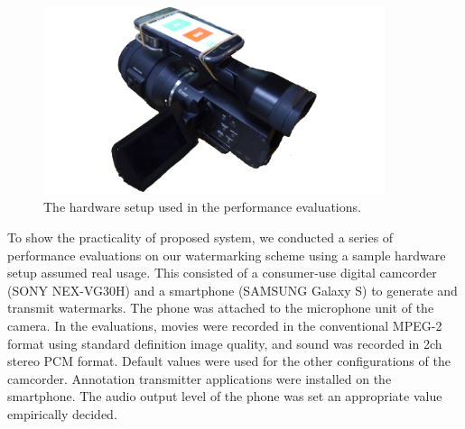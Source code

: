 \begin{figure}[htbp]
 \begin{center}
  \includegraphics[width=100mm]{evaluation_environment.pdf}
 \end{center}
 \caption{The hardware setup used in the performance evaluations.}
 \label{fig:eval_hard}
\end{figure}

To show the practicality of proposed system, we conducted a series of performance evaluations on our watermarking scheme using a sample hardware setup assumed real usage.
This consisted of a consumer-use digital camcorder (SONY NEX-VG30H) and a smartphone (SAMSUNG Galaxy S) to generate and transmit watermarks.
The phone was attached to the microphone unit of the camera.
In the evaluations, movies were recorded in the conventional MPEG-2 format using standard definition image quality, and sound was recorded in 2ch stereo PCM format.
Default values were used for the other configurations of the camcorder.
Annotation transmitter applications were installed on the smartphone.
The audio output level of the phone was set an appropriate value empirically decided.
